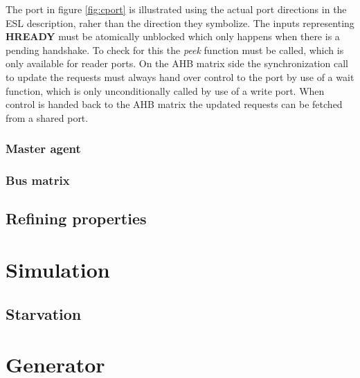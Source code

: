 The port in figure \ref{fig:cport} is illustrated using the actual port directions in the ESL description, raher than the direction they symbolize. The inputs representing \textbf{HREADY} must be atomically unblocked which only happens when there is a pending handshake. To check for this the \textit{peek} function must be called, which is only available for reader ports. On the AHB matrix side the synchronization call to update the requests must always hand over control to the port by use of a wait function, which is only unconditionally called by use of a write port. When control is handed back to the AHB matrix the updated requests can be fetched from a shared port. 

\subsubsection{Master agent}

\subsubsection{Bus matrix}

\subsection{Refining properties}

\section{Simulation}
\label{sec:sim}

\subsection{Starvation}

\section{Generator}
\label{sec:generator}
